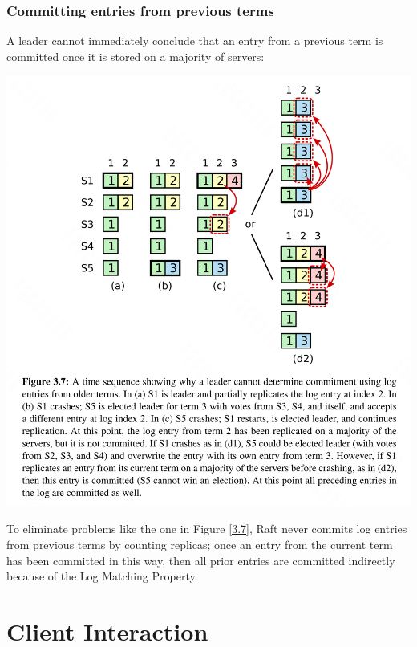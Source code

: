 \documentclass[11pt]{article}
\begin{document}
\subsubsection{Committing entries from previous terms}
\label{sec:org6213ddd}
A leader cannot immediately conclude that an entry from a previous term is committed once it is stored
on a majority of servers:
\begin{center}
\includegraphics[width=.9\textwidth]{../../images/papers/12.png}
\label{3.7}
\end{center}

To eliminate problems like the one in Figure \ref{3.7}, Raft never commits log entries from previous
terms by counting replicas; once an entry from the current term has been committed in this way, then all prior
entries are committed indirectly because of the Log Matching Property.
\section{Client Interaction}
\label{sec:orgccf23c9}
\end{document}
